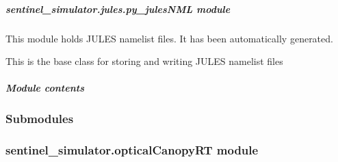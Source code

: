\documentclass[letterpaper,10pt,english]{sphinxmanual}
\begin{document}
\subparagraph{sentinel\_simulator.jules.py\_julesNML module}
\label{source/sentinel_simulator.jules:module-sentinel_simulator.jules.py_julesNML}\label{source/sentinel_simulator.jules:sentinel-simulator-jules-py-julesnml-module}
This module holds JULES namelist files. 
It has been automatically generated.

\begin{fulllineitems}
\label{source/sentinel_simulator.jules:sentinel_simulator.jules.py_julesNML.julesNML}
This is the base class for storing
and writing JULES namelist files

\begin{fulllineitems}
\label{source/sentinel_simulator.jules:sentinel_simulator.jules.py_julesNML.julesNML.update}
\end{fulllineitems}


\begin{fulllineitems}
\label{source/sentinel_simulator.jules:sentinel_simulator.jules.py_julesNML.julesNML.write}
\end{fulllineitems}


\end{fulllineitems}



\subparagraph{Module contents}
\label{source/sentinel_simulator.jules:module-sentinel_simulator.jules}\label{source/sentinel_simulator.jules:module-contents}

\subsubsection{Submodules}
\label{source/sentinel_simulator:submodules}

\subsubsection{sentinel\_simulator.opticalCanopyRT module}
\label{source/sentinel_simulator:sentinel-simulator-opticalcanopyrt-module}\label{source/sentinel_simulator:module-sentinel_simulator.opticalCanopyRT}
\end{document}
